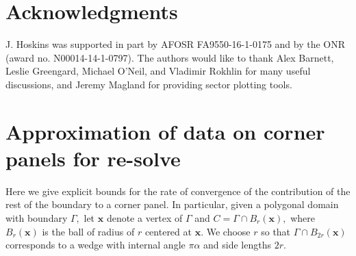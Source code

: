 \documentclass[12pt,times]{elsarticle}
\newcommand{\bx}{\boldsymbol{x}}
\begin{document}








\section{Acknowledgments}
J. Hoskins was supported in part by AFOSR FA9550-16-1-0175 and by the ONR (award no. N00014-14-1-0797).
The authors would like to thank Alex Barnett, Leslie Greengard, Michael O'Neil, and Vladimir Rokhlin for many useful discussions, and Jeremy Magland for providing sector plotting tools.

\appendix
\section{Approximation of data on corner panels for re-solve}
Here we give explicit bounds for the rate of convergence of the contribution of the rest of the boundary to a corner panel. In particular, given a polygonal domain with boundary $\Gamma,$ let $\bx$ denote a vertex of $\Gamma$ and $C = \Gamma \cap B_r(\bx),$ where $B_r(\bx)$ is the ball of radius of $r$ centered at $\bx.$ We choose $r$ so that $\Gamma \cap B_{2r}(\bx)$ corresponds to a wedge with internal angle $\pi \alpha$ and side lengths $2r.$ 

\end{document}
